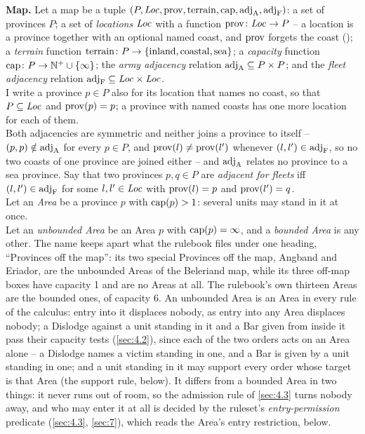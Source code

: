 \documentclass[12pt,a4paper]{article}
\begin{document}
\textbf{Map.}
Let a map be a tuple $(P, \mathit{Loc}, \operatorname{prov}, \operatorname{terrain}, \operatorname{cap}, \mathrm{adj}_{\mathrm{A}}, \mathrm{adj}_{\mathrm{F}})$: a set of provinces $P$; a set of \emph{locations} $\mathit{Loc}$ with a function $\operatorname{prov}\colon \mathit{Loc} \to P$ -- a location is a province together with an optional named coast, and $\operatorname{prov}$ forgets the coast (); a \emph{terrain} function $\operatorname{terrain}\colon P \to \{\mathrm{inland}, \mathrm{coastal}, \mathrm{sea}\}$; a \emph{capacity} function $\operatorname{cap}\colon P \to \mathbb{N}^{+} \cup \{\infty\}$; the \emph{army adjacency} relation $\mathrm{adj}_{\mathrm{A}} \subseteq P \times P$; and the \emph{fleet adjacency} relation $\mathrm{adj}_{\mathrm{F}} \subseteq \mathit{Loc} \times \mathit{Loc}$.\\
I write a province $p \in P$ also for its location that names no coast, so that $P \subseteq \mathit{Loc}$ and $\operatorname{prov}(p) = p$; a province with named coasts has one more location for each of them.\\
Both adjacencies are symmetric and neither joins a province to itself -- $(p, p) \notin \mathrm{adj}_{\mathrm{A}}$ for every $p \in P$, and $\operatorname{prov}(l) \ne \operatorname{prov}(l')$ whenever $(l, l') \in \mathrm{adj}_{\mathrm{F}}$, so no two coasts of one province are joined either -- and $\mathrm{adj}_{\mathrm{A}}$ relates no province to a sea province.
Say that two provinces $p, q \in P$ are \emph{adjacent for fleets} iff $(l, l') \in \mathrm{adj}_{\mathrm{F}}$ for some $l, l' \in \mathit{Loc}$ with $\operatorname{prov}(l) = p$ and $\operatorname{prov}(l') = q$.\\
Let an \emph{Area} be a province $p$ with $\operatorname{cap}(p) > 1$: several units may stand in it at once.\\
Let an \emph{unbounded Area} be an Area $p$ with $\operatorname{cap}(p) = \infty$, and a \emph{bounded Area} is any other.
The name keeps apart what the rulebook files under one heading, ``Provinces off the map'': its two special Provinces off the map, Angband and Eriador, are the unbounded Areas of the Beleriand map, while its three off-map boxes have capacity 1 and are no Areas at all.
The rulebook's own thirteen Areas are the bounded ones, of capacity 6.
An unbounded Area is an Area in every rule of the calculus: entry into it displaces nobody, as entry into any Area displaces nobody; a Dislodge against a unit standing in it and a Bar given from inside it pass their capacity tests (\cref{sec:4.2}), since each of the two orders acts on an Area alone -- a Dislodge names a victim standing in one, and a Bar is given by a unit standing in one; and a unit standing in it may support every order whose target is that Area (the support rule, below).
It differs from a bounded Area in two things: it never runs out of room, so the admission rule of \cref{sec:4.3} turns nobody away, and who may enter it at all is decided by the ruleset's \emph{entry-permission} predicate (\cref{sec:4.3}, \cref{sec:7}), which reads the Area's entry restriction, below.\\
\end{document}
